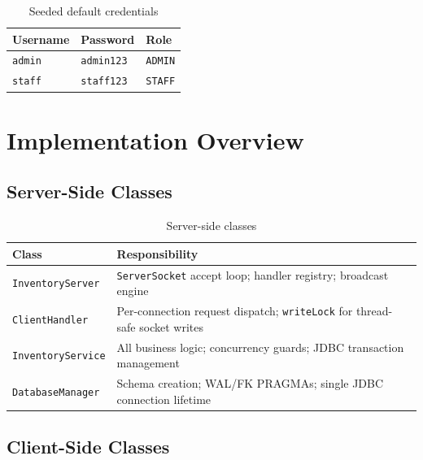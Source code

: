 \documentclass[12pt,a4paper]{article}
\begin{document}
\begin{table}[H]
\centering
\begin{tabular}{lll}
\toprule
\textbf{Username} & \textbf{Password} & \textbf{Role} \\
\midrule
\texttt{admin} & \texttt{admin123} & \texttt{ADMIN} \\
\texttt{staff} & \texttt{staff123} & \texttt{STAFF} \\
\bottomrule
\end{tabular}
\caption{Seeded default credentials}
\end{table}

\section{Implementation Overview}

\subsection{Server-Side Classes}

\begin{table}[H]
\centering
\begin{tabularx}{\linewidth}{lX}
\toprule
\textbf{Class} & \textbf{Responsibility} \\
\midrule
\texttt{InventoryServer}    & \texttt{ServerSocket} accept loop; handler registry; broadcast engine \\
\texttt{ClientHandler}      & Per-connection request dispatch; \texttt{writeLock} for thread-safe socket writes \\
\texttt{InventoryService}   & All business logic; concurrency guards; JDBC transaction management \\
\texttt{DatabaseManager}    & Schema creation; WAL/FK PRAGMAs; single JDBC connection lifetime \\
\bottomrule
\end{tabularx}
\caption{Server-side classes}
\end{table}

\subsection{Client-Side Classes}
\end{document}
